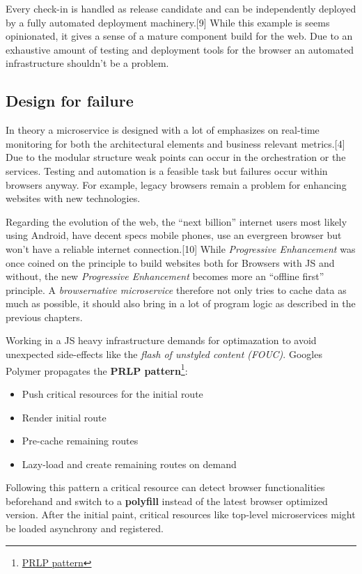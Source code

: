 \documentclass[]{assets/latex/ieee}
\providecommand{\tightlist}{%
  \setlength{\itemsep}{0pt}\setlength{\parskip}{0pt}}
\begin{document}
Every check-in is handled as release candidate and can be independently
deployed by a fully automated deployment machinery.{[}9{]} While this
example is seems opinionated, it gives a sense of a mature component
build for the web. Due to an exhaustive amount of testing and deployment
tools for the browser an automated infrastructure shouldn't be a
problem.

\subsection{Design for failure}\label{design-for-failure}

In theory a microservice is designed with a lot of emphasizes on
real-time monitoring for both the architectural elements and business
relevant metrics.{[}4{]} Due to the modular structure weak points can
occur in the orchestration or the services. Testing and automation is a
feasible task but failures occur within browsers anyway. For example,
legacy browsers remain a problem for enhancing websites with new
technologies.

Regarding the evolution of the web, the ``next billion'' internet users
most likely using Android, have decent specs mobile phones, use an
evergreen browser but won't have a reliable internet connection.{[}10{]}
While \emph{Progressive Enhancement} was once coined on the principle to
build websites both for Browsers with JS and without, the new
\emph{Progressive Enhancement} becomes more an ``offline first''
principle. A \emph{browsernative microservice} therefore not only tries
to cache data as much as possible, it should also bring in a lot of
program logic as described in the previous chapters.

Working in a JS heavy infrastructure demands for optimazation to avoid
unexpected side-effects like the \emph{flash of unstyled content
(FOUC)}. Googles Polymer propagates the \textbf{PRLP pattern}\footnote{\href{https://www.polymer-project.org/1.0/toolbox/server}{PRLP
  pattern}}:

\begin{itemize}
\tightlist
\item
  Push critical resources for the initial route
\item
  Render initial route
\item
  Pre-cache remaining routes
\item
  Lazy-load and create remaining routes on demand
\end{itemize}

Following this pattern a critical resource can detect browser
functionalities beforehand and switch to a \textbf{polyfill} instead of
the latest browser optimized version. After the initial paint, critical
resources like top-level microservices might be loaded asynchrony and
registered.
\end{document}
